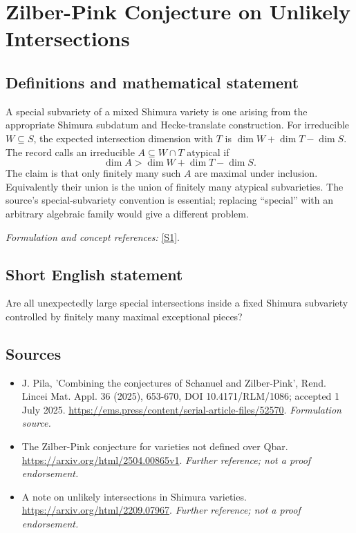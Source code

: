\documentclass[11pt]{article}
\begin{document}
\section*{\texorpdfstring{Zilber-Pink Conjecture on Unlikely Intersections}{Zilber-Pink Conjecture on Unlikely Intersections}}\label{82}
\subsection{Definitions and mathematical statement}
A special subvariety of a mixed Shimura variety is one arising from the appropriate Shimura subdatum and Hecke-translate construction. For irreducible $W\subseteq S$, the expected intersection dimension with $T$ is $\dim W+\dim T-\dim S$. The record calls an irreducible $A\subseteq W\cap T$ atypical if
\[
 \dim A>\dim W+\dim T-\dim S.
\]
The claim is that only finitely many such $A$ are maximal under inclusion. Equivalently their union is the union of finitely many atypical subvarieties. The source's special-subvariety convention is essential; replacing ``special'' with an arbitrary algebraic family would give a different problem.
\par\smallskip\textit{Formulation and concept references:} \href{https://ems.press/content/serial-article-files/52570}{[S1]}.

\subsection{Short English statement}
Are all unexpectedly large special intersections inside a fixed Shimura subvariety controlled by finitely many maximal exceptional pieces?
\subsection{Sources}
\begin{itemize}
\item[S1]J. Pila, 'Combining the conjectures of Schanuel and Zilber-Pink', Rend. Lincei Mat. Appl. 36 (2025), 653-670, DOI 10.4171/RLM/1086; accepted 1 July 2025.
\url{https://ems.press/content/serial-article-files/52570}.
\textit{Formulation source.}
\item[S2]The Zilber-Pink conjecture for varieties not defined over Qbar.
\url{https://arxiv.org/html/2504.00865v1}.
\textit{Further reference; not a proof endorsement.}
\item[S3]A note on unlikely intersections in Shimura varieties.
\url{https://arxiv.org/html/2209.07967}.
\textit{Further reference; not a proof endorsement.}
\end{itemize}
\end{document}
